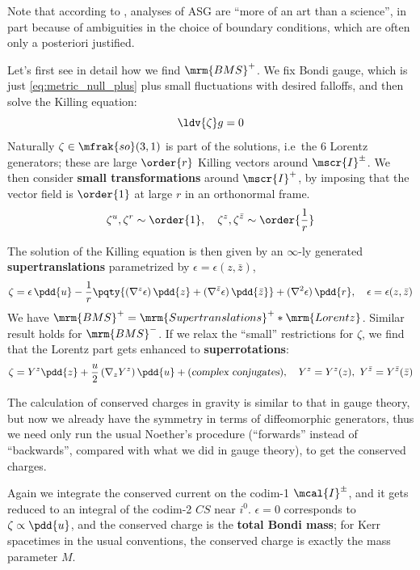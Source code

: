 \documentclass[a4paper
	,10pt
]{article}
\begin{document}
	Note that according to \cite{Strominger:2017zoo}, analyses of ASG are ``more of an art than a science'', in part because of ambiguities in the choice of boundary conditions, which are often only a posteriori justified. 
	
	Let's first see in detail how we find $\mrm{BMS}^+$. We fix Bondi gauge, which is just \eqref{eq:metric_null_plus} plus small fluctuations with desired falloffs, and then solve the Killing equation:
	\begin{equation}
		\ldv{\zeta} g = 0
	\end{equation}
	Naturally $\zeta \in \mfrak{so}(3,1)$ is part of the solutions, i.e~the 6 Lorentz generators; these are large $\order{r}$ Killing vectors around $\mscr{I}^\pm$. 
	We then consider \textbf{small transformations} around $\mscr{I}^+$, by imposing that the vector field is $\order{1}$ at large $r$ in an orthonormal frame. 
	\begin{equation}
		\zeta^u,\zeta^r
		\sim \order{1},
	\quad
		\zeta^z,\zeta^{\bar{z}}
		\sim \order{\frac{1}{r}}
	\end{equation}
	
	The solution of the Killing equation is then given by an $\infty$-ly generated \textbf{supertranslations} parametrized by $\epsilon = \epsilon(z,\bar{z})$,
	\begin{equation}
		\zeta
		= \epsilon\,\pdd{u}
		- \frac{1}{r} \pqty{
			(\nabla^z \epsilon)\,\pdd{z}
			+ (\nabla^{\bar{z}} \epsilon)\,\pdd{\bar{z}}
		} + (\nabla^2 \epsilon)\,\pdd{r},
	\quad
		\epsilon = \epsilon(z,\bar{z})
	\end{equation}
	We have $\mrm{BMS}^+ = \mrm{Supertranslations}^+ * \mrm{Lorentz}$. Similar result holds for $\mrm{BMS}^-$. If we relax the ``small'' restrictions for $\zeta$, we find that the Lorentz part gets enhanced to \textbf{superrotations}:
	\begin{equation}
		\zeta
		= Y^z \pdd{z}
			+ \frac{u}{2}\,(\nabla_z Y^z)\,\pdd{u}
			+ (\textsl{complex conjugates}),
	\quad
		Y^z = Y^z(z),\ %
		Y^{\bar{z}} = Y^{\bar{z}}(\bar{z})
	\end{equation}
	
	The calculation of conserved charges in gravity is similar to that in gauge theory, but now we already have the symmetry in terms of diffeomorphic generators, thus we need only run the usual Noether's procedure (``forwards'' instead of ``backwards'', compared with what we did in gauge theory), to get the conserved charges. 
	
	Again we integrate the conserved current on the codim-1 $\mcal{I}^\pm$, and it gets reduced to an integral of the codim-2 $CS$ near $i^0$. $\epsilon = 0$ corresponds to $\zeta \propto \pdd{u}$, and the conserved charge is the \textbf{total Bondi mass}; for Kerr spacetimes in the usual conventions, the conserved charge is exactly the mass parameter $M$. 
	
\end{document}
